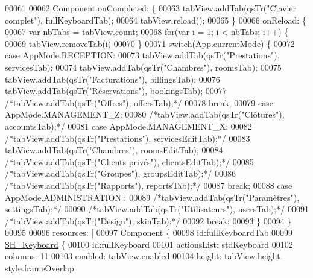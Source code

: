 \begin{DoxyCode}
00061 
00062     Component.onCompleted: \{
00063         tabView.addTab(qsTr(\textcolor{stringliteral}{"Clavier complet"}), fullKeyboardTab);
00064         tabView.reload();
00065     \}
00066     onReload: \{
00067         var nbTabs = tabView.count;
00068         \textcolor{keywordflow}{for}(var i = 1; i < nbTabs; i++) \{
00069             tabView.removeTab(i)
00070         \}
00071         \textcolor{keywordflow}{switch}(App.currentMode) \{
00072         \textcolor{keywordflow}{case} AppMode.RECEPTION:
00073             tabView.addTab(qsTr(\textcolor{stringliteral}{"Prestations"}), servicesTab);
00074             tabView.addTab(qsTr(\textcolor{stringliteral}{"Chambres"}), roomsTab);
00075             tabView.addTab(qsTr(\textcolor{stringliteral}{"Facturations"}), billingsTab);
00076             tabView.addTab(qsTr(\textcolor{stringliteral}{"Réservations"}), bookingsTab);
00077             \textcolor{comment}{/*tabView.addTab(qsTr("Offres"), offersTab);*/}
00078             \textcolor{keywordflow}{break};
00079         \textcolor{keywordflow}{case} AppMode.MANAGEMENT\_Z:
00080             \textcolor{comment}{/*tabView.addTab(qsTr("Clôtures"), accountsTab);*/}
00081         \textcolor{keywordflow}{case} AppMode.MANAGEMENT\_X:
00082             \textcolor{comment}{/*tabView.addTab(qsTr("Prestations"), servicesEditTab);*/}
00083             tabView.addTab(qsTr(\textcolor{stringliteral}{"Chambres"}), roomsEditTab);
00084             \textcolor{comment}{/*tabView.addTab(qsTr("Clients privés"), clientsEditTab);*/}
00085             \textcolor{comment}{/*tabView.addTab(qsTr("Groupes"), groupsEditTab);*/}
00086             \textcolor{comment}{/*tabView.addTab(qsTr("Rapports"), reportsTab);*/}
00087             \textcolor{keywordflow}{break};
00088         \textcolor{keywordflow}{case} AppMode.ADMINISTRATION :
00089             \textcolor{comment}{/*tabView.addTab(qsTr("Paramètres"), settingsTab);*/}
00090             \textcolor{comment}{/*tabView.addTab(qsTr("Utilisateurs"), usersTab);*/}
00091             \textcolor{comment}{/*tabView.addTab(qsTr("Design"), skinTab);*/}
00092             \textcolor{keywordflow}{break};
00093         \}
00094     \}
00095 
00096     resources: [
00097         Component \{
00098             \textcolor{keywordtype}{id}:fullKeyboardTab
00099             \hyperlink{classSH__Keyboard}{SH\_Keyboard} \{
00100                 \textcolor{keywordtype}{id}:fullKeyboard
00101                 actionsList: stdKeyboard
00102                 columns: 11
00103                 enabled: tabView.enabled
00104                 height: tabView.height-style.frameOverlap

\end{DoxyCode}
